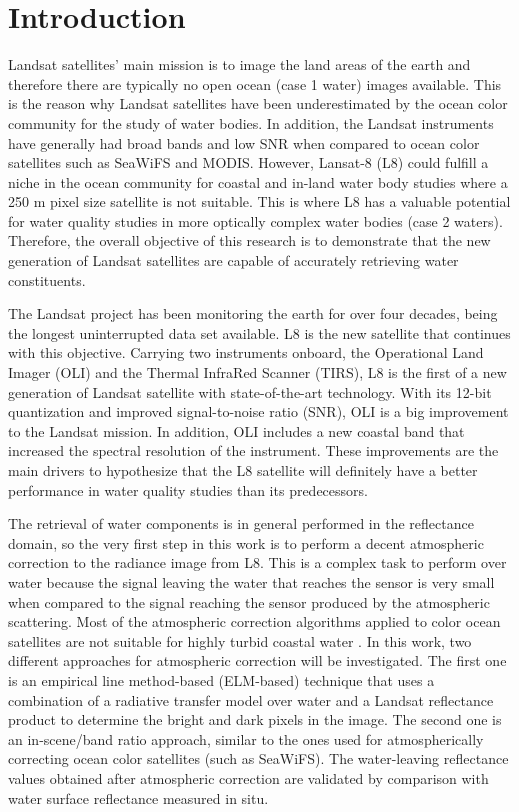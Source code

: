 \chapter{Introduction}
\label{ch:introduction} 
Landsat satellites' main mission is to image the land areas of the earth and therefore there are typically no open ocean (case 1 water) images available. This is the reason why Landsat satellites have been underestimated by the ocean color community for the study of water bodies. In addition, the Landsat instruments have generally had broad bands and low SNR when compared to ocean color satellites such as SeaWiFS and MODIS. However, Lansat-8 (L8) could fulfill a niche in the ocean community for coastal and in-land water  body studies where a 250 m pixel size satellite is not suitable. This is where L8 has a valuable potential for water quality studies in more optically complex water bodies (case 2 waters). Therefore, the overall objective of this research is to demonstrate that the new generation of Landsat satellites are capable of accurately retrieving water constituents.

The Landsat project has been monitoring the earth for over four decades, being the longest uninterrupted data set available. L8 is the new satellite that continues with this objective. Carrying two instruments onboard, the Operational Land Imager (OLI) and the Thermal InfraRed Scanner (TIRS), L8 is the first of a new generation of Landsat satellite with state-of-the-art technology. With its 12-bit quantization and improved signal-to-noise ratio (SNR), OLI is a big improvement to the Landsat mission. In addition, OLI includes a new coastal band that increased the spectral resolution of the instrument. These improvements are the main drivers to hypothesize that the L8 satellite will definitely have a better performance in water quality studies than its predecessors. 

The retrieval of water components is {\color{red} in general performed in the reflectance domain}, so the very first step in this work is to perform a {\color{red} decent} atmospheric correction to the radiance image from L8. This is a complex task to perform over water because the signal leaving the water that reaches the sensor is very small when compared to the signal reaching the sensor produced by the atmospheric scattering. Most of the atmospheric correction algorithms applied to color ocean satellites are not suitable for highly turbid coastal water \cite{Patt2003}. In this work, two different approaches for atmospheric correction will be investigated. The first one is an empirical line method-based (ELM-based) technique that uses a combination of a radiative transfer model over water and a Landsat reflectance product to determine the bright and dark pixels in the image. The second one is an { in-scene/band} ratio approach, similar to the ones used for atmospherically correcting ocean color satellites (such as SeaWiFS). The water-leaving reflectance values obtained after atmospheric correction are validated by comparison with water surface reflectance measured in situ. 

